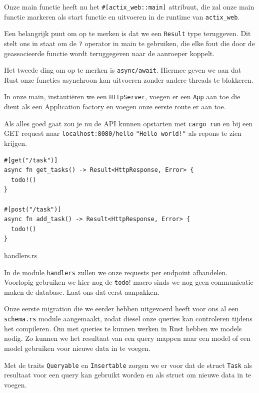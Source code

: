 Onze main functie heeft nu het \texttt{#[actix_web::main]} attribuut, die zal onze main
functie markeren als start functie en uitvoeren in de runtime van \texttt{actix_web}.

Een belangrijk punt om op te merken is dat we een \texttt{Result} type teruggeven. Dit
stelt ons in staat om de \texttt{?} operator in main te gebruiken, die elke fout die door
de geassocieerde functie wordt teruggegeven naar de aanroeper koppelt.

Het tweede ding om op te merken is \texttt{async/await}. Hiermee geven we aan dat Rust
onze functies asynchroon kan uitvoeren zonder andere threads te blokkeren.

In onze main, instantiëren we een \texttt{HttpServer}, voegen er een
\texttt{App} aan toe die dient als een
Application factory en voegen onze eerste route er aan toe.

Als alles goed gaat zou je nu de API kunnen opstarten met \texttt{cargo run} en bij een
GET request naar \texttt{localhost:8080/hello} \texttt{"Hello world!"} als repons 
te zien krijgen.

\begin{listing}[h]
\begin{verbatim}
#[get("/task")]
async fn get_tasks() -> Result<HttpResponse, Error> {
  todo!()
}

#[post("/task")]
async fn add_task() -> Result<HttpResponse, Error> {
  todo!()
}
\end{verbatim}
\caption{handlers.rs}
\end{listing}

In de module \texttt{handlers} zullen we onze requests per endpoint afhandelen. Voorlopig
gebruiken we hier nog de \texttt{todo}! macro sinds we nog geen communicatie maken de
database. Laat ons dat eerst aanpakken.

Onze eerste migration die we eerder hebben uitgevoerd heeft voor ons al een
\texttt{schema.rs} module aangemaakt, zodat diesel onze queries kan controleren tijdens
het compileren. Om met queries te kunnen werken in Rust hebben we models nodig. Zo kunnen we het
resultaat van een query mappen naar een model of een model gebruiken voor nieuwe data in te voegen.

Met de traits \texttt{Queryable} en \texttt{Insertable} zorgen we er voor dat de
struct \texttt{Task} als resultaat voor een query kan gebruikt worden en als struct om
nieuwe data in te voegen.

